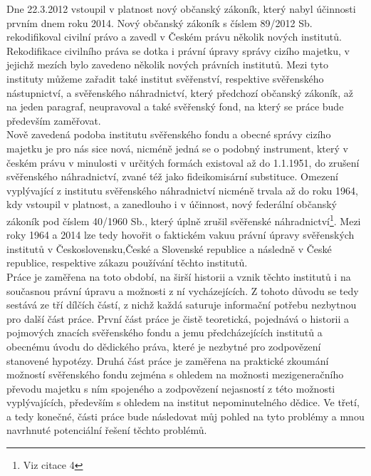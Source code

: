 \documentclass{article}
\begin{document}
\indent Dne 22.3.2012 vstoupil v platnost nový občanský zákoník, který nabyl účinnosti prvním dnem roku 2014. Nový občanský zákoník s číslem 89/2012 Sb. rekodifikoval civilní právo a zavedl v Českém právu několik nových institutů. Rekodifikace civilního práva se dotka i právní úpravy správy cizího majetku, v jejichž mezích bylo zavedeno několik nových právních institutů. Mezi tyto instituty můžeme zařadit také institut svěřenství, respektive svěřenského nástupnictví, a svěřenského náhradnictví, který předchozí občanský zákoník, až na jeden paragraf, neupravoval a také svěřenský fond, na který se práce bude především zaměřovat. \\

\indent Nově zavedená podoba institutu svěřenského fondu a obecné správy cizího majetku je pro nás sice nová, nicméně jedná se o podobný instrument, který v českém právu v minulosti v určitých formách existoval až do 1.1.1951, do zrušení svěřens\-kého náhradnictví, zvané též jako fideikomisární substituce. Omezení vyplývající z institutu svěřenského náhradnictví nicméně trvala až do roku 1964, kdy vstoupil v platnost, a zanedlouho i v účinnost, nový federální občanský zákoník pod číslem 40/1960 Sb., který úplně zrušil svěřenské náhradnictví\footnote{Viz citace 4}. Mezi roky 1964 a 2014 lze tedy hovořit o faktickém vakuu právní úpravy svěřen\-ských institutů v Československu,České a Slovenské republice a následně v České republice, respektive zákazu používání těchto institutů.\\

\indent Práce je zaměřena na toto období, na širší historii a vznik těchto institutů i na současnou právní úpravu a možnosti z ní vycházejících. Z tohoto důvodu se tedy sestává ze tří dílčích částí, z nichž každá saturuje informační potřebu nezbytnou pro další část práce. První část práce je čistě teoretická, pojednává o historii a pojmových znacích svěřenského fondu a jemu předcházejících institutů a obecnému úvodu do dědického práva, které je nezbytné pro zodpovězení stanovené hypotézy. Druhá část práce je zaměřena na praktické zkou\-mání možností svěřenského fondu zejména s ohledem na možnosti mezigeneračního převodu majetku s ním spojeného a zodpovězení nejasností z této možnosti vyplývajících, především s ohledem na institut nepominutelného dědice. Ve třetí, a tedy konečné, části práce bude následovat můj pohled na tyto problémy a mnou navrhnuté potenciální řešení těchto problémů. 
\end{document}
